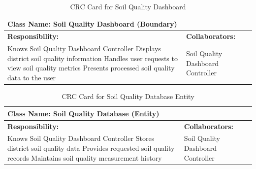 \documentclass[]{article}
\begin{document}
\begin{table}[H]
    \centering
    \caption{CRC Card for Soil Quality Dashboard}
    \vspace{1mm}
    \begin{tabular}{|p{7.5cm}|p{7.5cm}|}
    \hline 
    \multicolumn{2}{|l|}{\textbf{Class Name: Soil Quality Dashboard (Boundary)}} \\
    \hline
    \textbf{Responsibility:} & \textbf{Collaborators:} \\
    \hline
        Knows Soil Quality Dashboard Controller \newline
        Displays district soil quality information \newline
        Handles user requests to view soil quality metrics \newline
        Presents processed soil quality data to the user \newline
        &
        Soil Quality Dashboard Controller \\
    \hline
    \end{tabular}
\end{table}
\begin{table}[H]
    \centering
    \caption{CRC Card for Soil Quality Database Entity}
    \vspace{1mm}
    \begin{tabular}{|p{7.5cm}|p{7.5cm}|}
    \hline 
    \multicolumn{2}{|l|}{\textbf{Class Name: Soil Quality Database (Entity)}} \\
    \hline
    \textbf{Responsibility:} & \textbf{Collaborators:} \\
    \hline
        Knows Soil Quality Dashboard Controller \newline
        Stores district soil quality data \newline
        Provides requested soil quality records \newline
        Maintains soil quality measurement history \newline
        &
        Soil Quality Dashboard Controller \\
    \hline
    \end{tabular}
\end{table}
\end{document}
